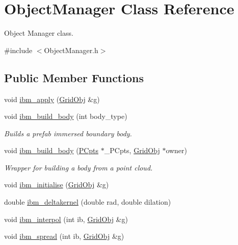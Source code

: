 \hypertarget{class_object_manager}{}\section{Object\+Manager Class Reference}
\label{class_object_manager}


Object Manager class.  




{\ttfamily \#include $<$Object\+Manager.\+h$>$}

\subsection*{Public Member Functions}
\begin{DoxyCompactItemize}
\item 
void \hyperlink{class_object_manager_a83174cbaabd95639f8b4f652ad398183}{ibm\+\_\+apply} (\hyperlink{class_grid_obj}{Grid\+Obj} \&g)
\item 
void \hyperlink{class_object_manager_af89336910b6f3157e5b17b4ea6d30a12}{ibm\+\_\+build\+\_\+body} (int body\+\_\+type)
\begin{DoxyCompactList}\small\item\em Builds a prefab immersed boundary body. \end{DoxyCompactList}\item 
void \hyperlink{class_object_manager_ac8270fe5b646e512a34748b5ca51671c}{ibm\+\_\+build\+\_\+body} (\hyperlink{class_p_cpts}{P\+Cpts} $\ast$\+\_\+\+P\+Cpts, \hyperlink{class_grid_obj}{Grid\+Obj} $\ast$owner)
\begin{DoxyCompactList}\small\item\em Wrapper for building a body from a point cloud. \end{DoxyCompactList}\item 
void \hyperlink{class_object_manager_abc6dd6c73900724e7c0025d66e803c95}{ibm\+\_\+initialise} (\hyperlink{class_grid_obj}{Grid\+Obj} \&g)
\item 
double \hyperlink{class_object_manager_a4e55e3a84bae37a75f8487fd575169fb}{ibm\+\_\+deltakernel} (double rad, double dilation)
\item 
void \hyperlink{class_object_manager_a4df9f08d3a47519884afa17f1ecaa1da}{ibm\+\_\+interpol} (int ib, \hyperlink{class_grid_obj}{Grid\+Obj} \&g)
\item 
void \hyperlink{class_object_manager_a91d38ea7d0fbc6fd93e8c34559492b48}{ibm\+\_\+spread} (int ib, \hyperlink{class_grid_obj}{Grid\+Obj} \&g)
\item 

\end{DoxyCompactItemize}
